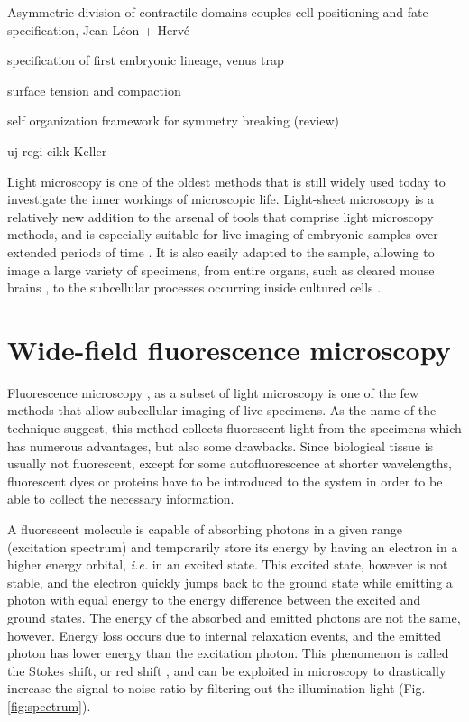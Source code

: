 Asymmetric division of contractile domains couples cell positioning and fate specification, Jean-Léon + Hervé \cite{maitre_asymmetric_2016}

specification of first embryonic lineage, venus trap \cite{dietrich_venus_2015}

surface tension and compaction \cite{maitre_pulsatile_2015}

self organization framework for symmetry breaking (review)


uj regi cikk Keller \cite{keller_life_2006}


Light microscopy is one of the oldest methods that is still widely used today to investigate the inner workings of microscopic life. Light-sheet microscopy is a relatively new addition to the arsenal of tools that comprise light microscopy methods, and is especially suitable for live imaging of embryonic samples over extended periods of time \cite{krzic_multiview_2012,tomer_quantitative_2012}. It is also easily adapted to the sample, allowing to image a large variety of specimens, from entire organs, such as cleared mouse brains \cite{dunsby_optically_2008}, to the subcellular processes occurring inside cultured cells \cite{capoulade_quantitative_2011}.


\section{Wide-field fluorescence microscopy}
  Fluorescence microscopy \cite{lichtman_fluorescence_2005}, as a subset of light microscopy is one of the few methods that allow subcellular imaging of live specimens. As the name of the technique suggest, this method collects fluorescent light from the specimens which has numerous advantages, but also some drawbacks. Since biological tissue is usually not fluorescent, except for some autofluorescence at shorter wavelengths, fluorescent dyes or proteins have to be introduced to the system in order to be able to collect the necessary information.

  A fluorescent molecule is capable of absorbing photons in a given range (excitation spectrum) and temporarily store its energy by having an electron in  a higher energy orbital, \textit{i.e.} in an excited state. This excited state, however is not stable, and the electron quickly jumps back to the ground state while emitting a photon with equal energy to the energy difference between the excited and ground states. The energy of the absorbed and emitted photons are not the same, however. Energy loss occurs due to internal relaxation events, and the emitted photon has lower energy than the excitation photon. This phenomenon is called the Stokes shift, or red shift \cite{stokes}, and can be exploited in microscopy to drastically increase the signal to noise ratio by filtering out the illumination light (Fig. \ref{fig:spectrum}).

